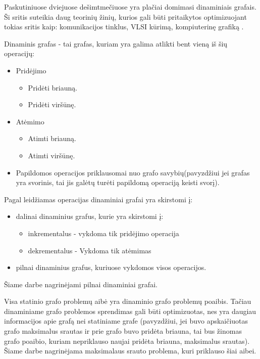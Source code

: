 Paskutiniuose dviejuose dešimtmečiuose yra plačiai domimasi dinaminiais grafais. Ši sritis suteikia daug teorinių žinių, kurios gali būti pritaikytos optimizuojant tokias sritis kaip: komunikacijos tinklus, VLSI kūrimą, kompiuterinę grafiką  \cite{DynamicGraphs}.

Dinaminis grafas - tai grafas, kuriam yra galima atlikti bent vieną iš šių operacijų:
\begin{itemize}
	\item Pridėjimo
	\begin{itemize}
		\item Pridėti briauną.
		\item Pridėti viršūnę.
	\end{itemize}
	\item Atėmimo
	\begin{itemize}
		\item Atimti briauną.
		\item Atimti viršūnę.
	\end{itemize}
	\item  Papildomos operacijos priklausomai nuo grafo savybių(pavyzdžiui jei grafas yra svorinis, tai jis galėtų turėti papildomą operaciją keisti svorį).
\end{itemize}
Pagal leidžiamas operacijas dinaminiai grafai yra skirstomi į:
\begin{itemize}
	\item dalinai dinaminius grafus, kurie yra skirstomi į:
	\begin{itemize}
		\item inkrementalus - vykdoma tik pridėjimo operacija
		\item dekrementalus - Vykdoma tik atėmimas
	\end{itemize}
	\item  pilnai dinaminius grafus, kuriuose vykdomos visos operacijos.
\end{itemize}
Šiame darbe nagrinėjami pilnai dinaminiai grafai.

Visa statinio grafo problemų aibė yra dinaminio grafo problemų poaibis. Tačiau dinaminiame grafo problemos sprendimas gali būti optimizuotas, nes yra daugiau informacijos apie grafą nei statiniame grafe (pavyzdžiui, jei buvo apskaičiuotas grafo maksimalus srautas ir prie grafo buvo pridėta briauna, tai bus žinomas grafo poaibio, kuriam nepriklauso naujai pridėta briauna, maksimalus srautas). Šiame darbe nagrinėjama maksimalaus srauto problema, kuri priklauso šiai aibei.


